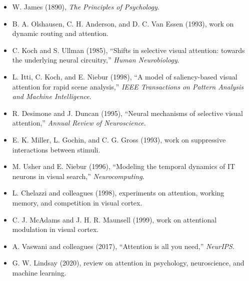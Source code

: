\begin{itemize}
    \item W. James (1890), \emph{The Principles of Psychology}.
    \item B. A. Olshausen, C. H. Anderson, and D. C. Van Essen (1993), work on dynamic routing and attention.
    \item C. Koch and S. Ullman (1985), ``Shifts in selective visual attention: towards the underlying neural circuitry,'' \emph{Human Neurobiology}.
    \item L. Itti, C. Koch, and E. Niebur (1998), ``A model of saliency-based visual attention for rapid scene analysis,'' \emph{IEEE Transactions on Pattern Analysis and Machine Intelligence}.
    \item R. Desimone and J. Duncan (1995), ``Neural mechanisms of selective visual attention,'' \emph{Annual Review of Neuroscience}.
    \item E. K. Miller, L. Gochin, and C. G. Gross (1993), work on suppressive interactions between stimuli.
    \item M. Usher and E. Niebur (1996), ``Modeling the temporal dynamics of IT neurons in visual search,'' \emph{Neurocomputing}.
    \item L. Chelazzi and colleagues (1998), experiments on attention, working memory, and competition in visual cortex.
    \item C. J. McAdams and J. H. R. Maunsell (1999), work on attentional modulation in visual cortex.
    \item A. Vaswani and colleagues (2017), ``Attention is all you need,'' \emph{NeurIPS}.
    \item G. W. Lindsay (2020), review on attention in psychology, neuroscience, and machine learning.
\end{itemize}
